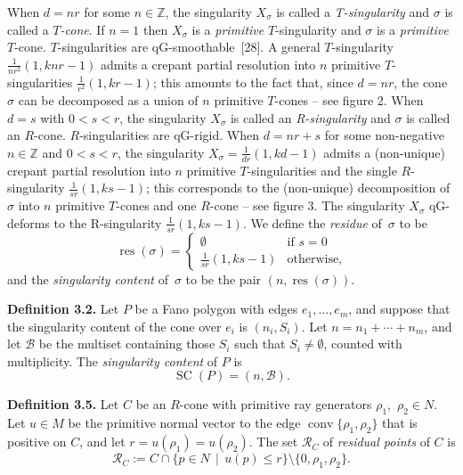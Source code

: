 \documentclass[11pt]{article}
\numberwithin{equation}{section}
\begin{document}
When $d=nr$ for some $n\in\mathbb{Z}$, the singularity $X_\sigma$ is called a \emph{T-singularity} and $\sigma$ is called a \emph{$T$-cone}. If $n=1$ then $X_\sigma$ is a \emph{primitive} $T$-singularity and $\sigma$ is a \emph{primitive} $T$-cone. $T$-singularities are qG-smoothable~\textup{[28]}. A general $T$-singularity $\frac{1}{n r^2}(1, knr-1)$ admits a crepant partial resolution into $n$ primitive $T$-singularities $\frac{1}{r^2}(1, kr-1)$; this amounts to the fact that, since $d = n r$, the cone $\sigma$ can be decomposed as a union of $n$ primitive $T$-cones -- see figure 2.
When $d = s$ with $0 < s < r$, the singularity $X_\sigma$ is called an \emph{R-singularity} and $\sigma$ is called an $R$-cone. $R$-singularities are qG-rigid. When $d = nr+s$ for some non-negative $n \in \mathbb{Z}$ and $0 < s < r$, the singularity $X_\sigma = \frac{1}{dr}(1, kd-1)$ admits a (non-unique) crepant partial resolution into $n$ primitive $T$-singularities and the single $R$-singularity $\frac{1}{sr}(1,ks-1)$; this corresponds to the (non-unique) decomposition of $\sigma$ into $n$ primitive $T$-cones and one $R$-cone -- see figure 3.
\noindent The singularity $X_\sigma$ qG-deforms to the R-singularity $\frac{1}{sr}(1,ks-1)$. We define the \emph{residue} of~$\sigma$ to be
\[
\operatorname{res}(\sigma)=\begin{cases}
\emptyset&\text{if $s=0$}\\
\frac{1}{sr}(1,ks-1)&\text{otherwise,}
\end{cases}
\]
and the \emph{singularity content} of~$\sigma$ to be the pair $(n,\operatorname{res}(\sigma))$.


\par\noindent\textbf{Definition 3.2.} 
Let $P$ be a Fano polygon with edges $e_1,\ldots,e_m$, and suppose that the singularity content of the cone over $e_i$ is $(n_i, S_i)$. Let $n = n_1 + \cdots + n_m$, and let $\mathcal{B}$ be the multiset containing those $S_i$ such that $S_i \ne \emptyset$, counted with multiplicity. The \emph{singularity content} of $P$ is
\[
\operatorname{SC}(P)=(n, \mathcal{B}).
\]

\par

\par\noindent\textbf{Definition 3.5.} 
Let $C$ be an $R$-cone with primitive ray generators $\rho_1$,~$\rho_2 \in N$. Let $u \in M$ be the primitive normal vector to the edge $\operatorname{conv}\{\rho_1,\rho_2\}$ that is positive on $C$, and let $r = u(\rho_1) = u(\rho_2)$. The set $\mathcal{R}_C$ of \emph{residual points} of $C$ is
\[
\mathcal{R}_C := C \cap \{p \in N \, \mid \, u(p) \leq r\} \setminus \{0, \rho_1, \rho_2\}.
\]
\end{document}
